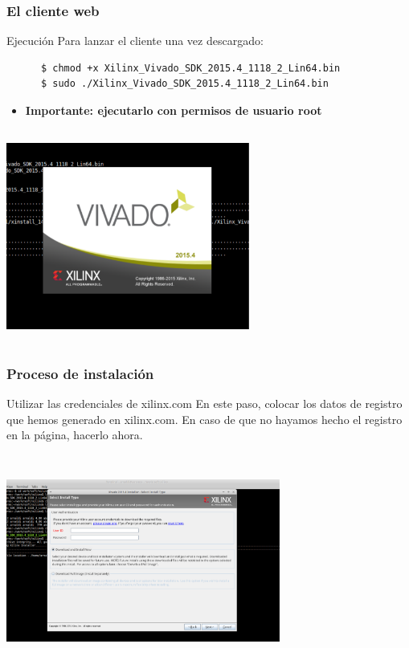 \documentclass[a4paper,11pt]{article}
\begin{document}
\subsubsection{El cliente web}
  Ejecución
    Para lanzar el cliente una vez descargado:
    \begin{verbatim}
      $ chmod +x Xilinx_Vivado_SDK_2015.4_1118_2_Lin64.bin
      $ sudo ./Xilinx_Vivado_SDK_2015.4_1118_2_Lin64.bin
    \end{verbatim}
    \begin{itemize}
      \item \textbf{Importante: ejecutarlo con permisos de usuario root}
    \end{itemize}
    \begin{center}
    \includegraphics[height=7cm,width=8cm]{vivado_installer_0}
    \end{center}

\subsubsection{Proceso de instalación}
  Utilizar las credenciales de xilinx.com
    En este paso, colocar los datos de registro que hemos generado en
    xilinx.com. En caso de que no hayamos hecho el registro en la página,
    hacerlo ahora.
    \begin{center}
    \includegraphics[height=7cm,width=9cm]{vivado_installer_2}
    \end{center}
\end{document}

